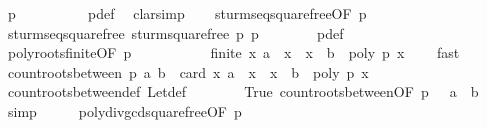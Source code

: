 \begin{isabellebody}
\ {\isachardoublequoteopen}p{\isacharprime}\ {\isasymnoteq}\ {}{\isachardoublequoteclose}\isanewline
\ \ \ \ \ \ \isamarkupfalse%
\ p{\isacharprime}{\isacharunderscore}def\ \isamarkupfalse%
\ clarsimp\isanewline
\isanewline
\ \ \isamarkupfalse%
\ sturm{\isacharunderscore}seq{\isacharunderscore}squarefree{\isacharbrackleft}OF\ {\isacharbackquoteopen}p\ {\isasymnoteq}\ {}{\isacharbackquoteclose}{\isacharbrackright}\isanewline
\ \ \ \ \ \ \isamarkupfalse%
\ sturm{\isacharunderscore}seq{\isacharunderscore}squarefree\ {\isachardoublequoteopen}sturm{\isacharunderscore}squarefree\ p{\isachardoublequoteclose}\ p{\isacharprime}\isanewline
\ \ \ \ \ \ \isamarkupfalse%
\ p{\isacharprime}{\isacharunderscore}def\ \isacommand{{\isachardot}}\isamarkupfalse%
\isanewline
\ \ \isamarkupfalse%
\ poly{\isacharunderscore}roots{\isacharunderscore}finite{\isacharbrackleft}OF\ {\isacharbackquoteopen}p{\isacharprime}\ {\isasymnoteq}\ {}{\isacharbackquoteclose}{\isacharbrackright}\ \isanewline
\ \ \ \ \ \ \isamarkupfalse%
\ {\isachardoublequoteopen}finite\ {\isacharbraceleft}x{\isachardot}\ a\ {\isacharless}\ x\ {\isasymand}\ x\ {\isasymle}\ b\ {\isasymand}\ poly\ p{\isacharprime}\ x\ {\isacharequal}\ {}{\isacharbraceright}{\isachardoublequoteclose}\ \isamarkupfalse%
\ fast\isanewline
\ \ \isamarkupfalse%
\ {\isachardoublequoteopen}count{\isacharunderscore}roots{\isacharunderscore}between\ p\ a\ b\ {\isacharequal}\ card\ {\isacharbraceleft}x{\isachardot}\ a\ {\isacharless}\ x\ {\isasymand}\ x\ {\isasymle}\ b\ {\isasymand}\ poly\ p{\isacharprime}\ x\ {\isacharequal}\ {}{\isacharbraceright}{\isachardoublequoteclose}\isanewline
\ \ \ \ \ \ \isamarkupfalse%
\ count{\isacharunderscore}roots{\isacharunderscore}between{\isacharunderscore}def\ Let{\isacharunderscore}def\isanewline
\ \ \ \ \ \ \isamarkupfalse%
\ True\ count{\isacharunderscore}roots{\isacharunderscore}between{\isacharbrackleft}OF\ {\isacharbackquoteopen}p{\isacharprime}\ {\isasymnoteq}\ {}{\isacharbackquoteclose}\ {\isacharbackquoteopen}a\ {\isasymle}\ b{\isacharbackquoteclose}{\isacharbrackright}\ \isamarkupfalse%
\ simp\isanewline
\ \ \isamarkupfalse%
\ \isamarkupfalse%
\ poly{\isacharunderscore}div{\isacharunderscore}gcd{\isacharunderscore}squarefree{\isacharparenleft}{}{\isacharparenright}{\isacharbrackleft}OF\ {\isacharbackquoteopen}p\ {\isasymnoteq}\ {}{\isacharbackquoteclose}{\isacharbrackright}\isanewline

\end{isabellebody}
